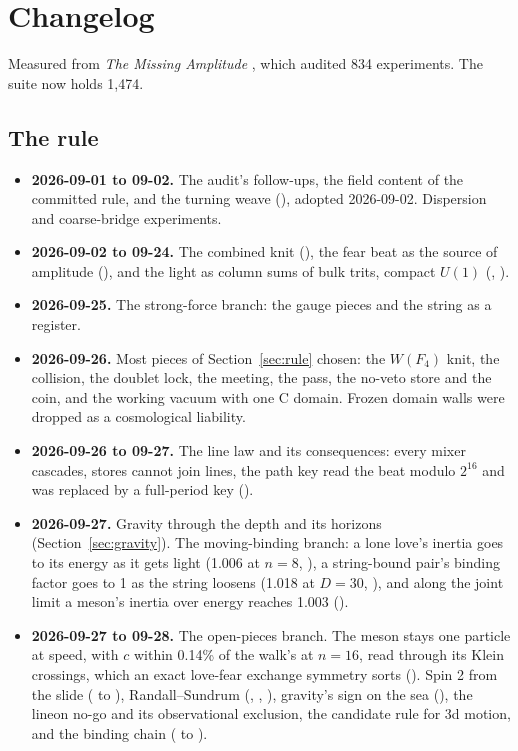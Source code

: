 \section{Changelog}
\label{sec:changelog}

Measured from \emph{The Missing Amplitude} \cite{pollard2026missing}, which audited 834 experiments. The suite now
holds 1,474.

\subsection{The rule}

\begin{itemize}
\item \textbf{2026-09-01 to 09-02.} The audit's follow-ups, the field content of the committed rule, and the turning
weave (), adopted 2026-09-02. Dispersion and coarse-bridge experiments.
\item \textbf{2026-09-02 to 09-24.} The combined knit (), the fear beat as the source of amplitude
(), and the light as column sums of bulk trits, compact $U(1)$ (,
).
\item \textbf{2026-09-25.} The strong-force branch: the gauge pieces and the string as a register.
\item \textbf{2026-09-26.} Most pieces of Section~\ref{sec:rule} chosen: the $W(F_4)$ knit, the collision, the doublet
lock, the meeting, the pass, the no-veto store and the coin, and the working vacuum with one C domain. Frozen domain
walls were dropped as a cosmological liability.
\item \textbf{2026-09-26 to 09-27.} The line law and its consequences: every mixer cascades, stores cannot join lines,
the path key read the beat modulo $2^{16}$ and was replaced by a full-period key ().
\item \textbf{2026-09-27.} Gravity through the depth and its horizons (Section~\ref{sec:gravity}). The moving-binding
branch: a lone love's inertia goes to its energy as it gets light (1.006 at $n = 8$, ), a string-bound
pair's binding factor goes to 1 as the string loosens (1.018 at $D = 30$, ), and along the joint limit
a meson's inertia over energy reaches 1.003 ().
\item \textbf{2026-09-27 to 09-28.} The open-pieces branch. The meson stays one particle at speed, with $c$ within
0.14\% of the walk's at $n = 16$, read through its Klein crossings, which an exact love-fear exchange symmetry sorts
(). Spin 2 from the slide ( to ), Randall--Sundrum
(, , ), gravity's sign on the sea (), the lineon
no-go and its observational exclusion, the candidate rule for 3d motion, and the binding chain ( to
).
\end{itemize}

